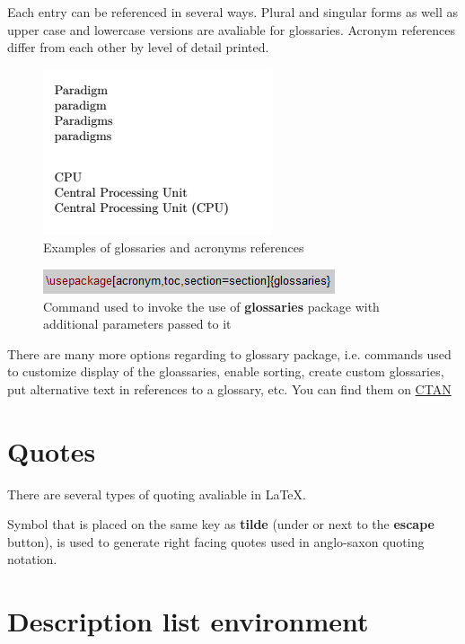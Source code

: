 Each entry can be referenced in several ways. Plural and singular forms as well as upper case and lowercase versions are avaliable for glossaries. Acronym references differ from each other by level of detail printed.

\begin{figure}[H]
\centering
\includegraphics[scale=1.0]{LaTeX/figures/glossary_calls.png}
\caption{Examples of glossaries and acronyms references}
\end{figure}

\begin{figure}[H]
\centering
\includegraphics[scale=1.0]{LaTeX/figures/usepackage_glossaries.png}
\caption{Command used to invoke the use of \textbf{glossaries} package with additional parameters passed to it}
\label{fig:usepackage_glossaries}
\end{figure}

There are many more options regarding to glossary package, i.e. commands used to customize display of the gloassaries, enable sorting, create custom glossaries, put alternative text in references to a glossary, etc. You can find them on	\href{https://www.ctan.org/pkg/glossaries}{CTAN}
\section{Quotes}

There are several types of quoting avaliable in \LaTeX.

Symbol that is placed on the same key as \textbf{tilde} (under or next to the \textbf{escape} button), is used to generate right facing quotes used in anglo-saxon quoting notation.

\fbox{\textcolor{red}{To finish}}

\section{Description list environment}

